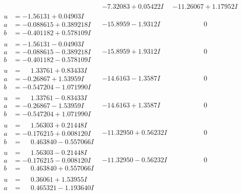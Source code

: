 \documentclass[1p]{elsarticle_modified}
\theoremstyle{definition}
\begin{document}
$$\begin{array}{c|c|c}
 & -7.32083 + 0.05422 I & -11.26067 + 1.17952 I \\ \hline\begin{aligned}
u &= -1.56131 + 0.04903 I \\
a &= -0.088615 + 0.389218 I \\
b &= -0.401182 + 0.578109 I\end{aligned}
 & -15.8959 - 1.9312 I & \phantom{-0.000000 } 0 \\ \hline\begin{aligned}
u &= -1.56131 - 0.04903 I \\
a &= -0.088615 - 0.389218 I \\
b &= -0.401182 - 0.578109 I\end{aligned}
 & -15.8959 + 1.9312 I & \phantom{-0.000000 } 0 \\ \hline\begin{aligned}
u &= \phantom{-}1.33761 + 0.83433 I \\
a &= -0.26867 + 1.53959 I \\
b &= -0.547204 - 1.071990 I\end{aligned}
 & -14.6163 - 1.3587 I & \phantom{-0.000000 } 0 \\ \hline\begin{aligned}
u &= \phantom{-}1.33761 - 0.83433 I \\
a &= -0.26867 - 1.53959 I \\
b &= -0.547204 + 1.071990 I\end{aligned}
 & -14.6163 + 1.3587 I & \phantom{-0.000000 } 0 \\ \hline\begin{aligned}
u &= \phantom{-}1.56303 + 0.21448 I \\
a &= -0.176215 + 0.008120 I \\
b &= \phantom{-}0.463840 - 0.557066 I\end{aligned}
 & -11.32950 + 0.56232 I & \phantom{-0.000000 } 0 \\ \hline\begin{aligned}
u &= \phantom{-}1.56303 - 0.21448 I \\
a &= -0.176215 - 0.008120 I \\
b &= \phantom{-}0.463840 + 0.557066 I\end{aligned}
 & -11.32950 - 0.56232 I & \phantom{-0.000000 } 0 \\ \hline\begin{aligned}
u &= \phantom{-}0.36061 + 1.53955 I \\
a &= \phantom{-}0.465321 - 1.193640 I \\

\end{aligned}
\end{array}$$
\end{document}

